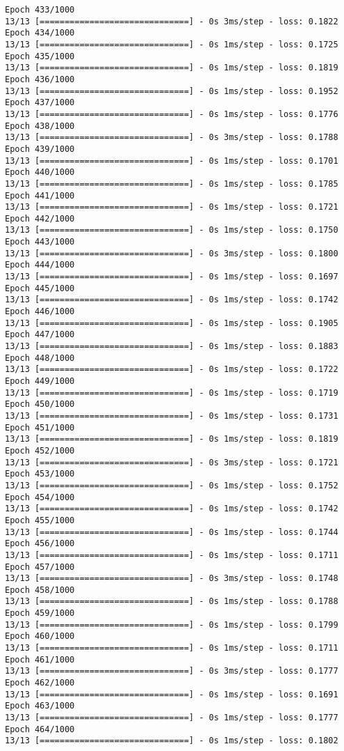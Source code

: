 \documentclass[11pt]{article}
\begin{document}
\begin{Verbatim}[commandchars=\\\{\}]
Epoch 433/1000
13/13 [==============================] - 0s 3ms/step - loss: 0.1822
Epoch 434/1000
13/13 [==============================] - 0s 1ms/step - loss: 0.1725
Epoch 435/1000
13/13 [==============================] - 0s 1ms/step - loss: 0.1819
Epoch 436/1000
13/13 [==============================] - 0s 1ms/step - loss: 0.1952
Epoch 437/1000
13/13 [==============================] - 0s 1ms/step - loss: 0.1776
Epoch 438/1000
13/13 [==============================] - 0s 3ms/step - loss: 0.1788
Epoch 439/1000
13/13 [==============================] - 0s 1ms/step - loss: 0.1701
Epoch 440/1000
13/13 [==============================] - 0s 1ms/step - loss: 0.1785
Epoch 441/1000
13/13 [==============================] - 0s 1ms/step - loss: 0.1721
Epoch 442/1000
13/13 [==============================] - 0s 1ms/step - loss: 0.1750
Epoch 443/1000
13/13 [==============================] - 0s 3ms/step - loss: 0.1800
Epoch 444/1000
13/13 [==============================] - 0s 1ms/step - loss: 0.1697
Epoch 445/1000
13/13 [==============================] - 0s 1ms/step - loss: 0.1742
Epoch 446/1000
13/13 [==============================] - 0s 1ms/step - loss: 0.1905
Epoch 447/1000
13/13 [==============================] - 0s 1ms/step - loss: 0.1883
Epoch 448/1000
13/13 [==============================] - 0s 1ms/step - loss: 0.1722
Epoch 449/1000
13/13 [==============================] - 0s 1ms/step - loss: 0.1719
Epoch 450/1000
13/13 [==============================] - 0s 1ms/step - loss: 0.1731
Epoch 451/1000
13/13 [==============================] - 0s 1ms/step - loss: 0.1819
Epoch 452/1000
13/13 [==============================] - 0s 3ms/step - loss: 0.1721
Epoch 453/1000
13/13 [==============================] - 0s 1ms/step - loss: 0.1752
Epoch 454/1000
13/13 [==============================] - 0s 1ms/step - loss: 0.1742
Epoch 455/1000
13/13 [==============================] - 0s 1ms/step - loss: 0.1744
Epoch 456/1000
13/13 [==============================] - 0s 1ms/step - loss: 0.1711
Epoch 457/1000
13/13 [==============================] - 0s 3ms/step - loss: 0.1748
Epoch 458/1000
13/13 [==============================] - 0s 1ms/step - loss: 0.1788
Epoch 459/1000
13/13 [==============================] - 0s 1ms/step - loss: 0.1799
Epoch 460/1000
13/13 [==============================] - 0s 1ms/step - loss: 0.1711
Epoch 461/1000
13/13 [==============================] - 0s 3ms/step - loss: 0.1777
Epoch 462/1000
13/13 [==============================] - 0s 1ms/step - loss: 0.1691
Epoch 463/1000
13/13 [==============================] - 0s 1ms/step - loss: 0.1777
Epoch 464/1000
13/13 [==============================] - 0s 1ms/step - loss: 0.1802

\end{Verbatim}
\end{document}
